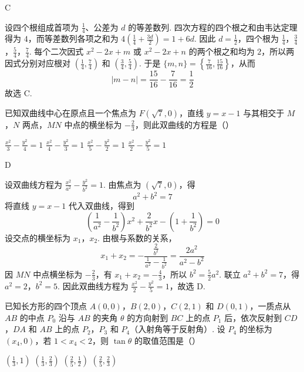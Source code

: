 \begin{answer}
C
\end{answer}

\begin{solution}
设四个根组成首项为 \(\frac14\)、公差为 \(d\) 的等差数列. 四次方程的四个根之和由韦达定理得为 \(4\)，而等差数列各项之和为 \(4\left(\frac14+\frac{3d}{2}\right)=1+6d\). 因此 \(d=\frac12\)，四个根为
\(\frac14\)，\(\frac34\)，\(\frac54\)，\(\frac74\).
每个二次因式 \(x^{2}-2x+m\) 或 \(x^{2}-2x+n\) 的两个根之和均为 \(2\)，所以两因式分别对应根对 \(\left(\frac14,\frac74\right)\) 和 \(\left(\frac34,\frac54\right)\). 于是 \(\{m,n\}=\left\{\frac{7}{16},\frac{15}{16}\right\}\)，从而
\[
|m-n|=\frac{15}{16}-\frac{7}{16}=\frac12
\]
故选 C.
\end{solution}

\begin{problem}
已知双曲线中心在原点且一个焦点为 \(F(\sqrt{7}, 0)\)，直线 \(y = x - 1\) 与其相交于 \(M\)，\(N\) 两点，\(MN\) 中点的横坐标为 \(-\frac{2}{3}\)，则此双曲线的方程是（\quad）

\choices
    {\(\frac{x^2}{3} - \frac{y^2}{4} = 1\)}
    {\(\frac{x^2}{4} - \frac{y^2}{3} = 1\)}
    {\(\frac{x^2}{5} - \frac{y^2}{2} = 1\)}
    {\(\frac{x^2}{2} - \frac{y^2}{5} = 1\)}
\end{problem}

\begin{answer}
D
\end{answer}

\begin{solution}
设双曲线方程为 \(\frac{x^{2}}{a^{2}}-\frac{y^{2}}{b^{2}}=1\). 由焦点为 \((\sqrt7,0)\)，得
\[
a^{2}+b^{2}=7
\]
将直线 \(y=x-1\) 代入双曲线，得到
\[
\left(\frac1{a^{2}}-\frac1{b^{2}}\right)x^{2}+\frac2{b^{2}}x-\left(1+\frac1{b^{2}}\right)=0
\]
设交点的横坐标为 \(x_{1}\)，\(x_{2}\). 由根与系数的关系，
\[
x_{1}+x_{2}=-\frac{\frac{2}{b^{2}}}{\frac{1}{a^{2}}-\frac{1}{b^{2}}}=\frac{2a^{2}}{a^{2}-b^{2}}
\]
因 \(MN\) 中点横坐标为 \(-\frac23\)，有 \(x_{1}+x_{2}=-\frac43\)，所以 \(b^{2}=\frac52a^{2}\). 联立 \(a^{2}+b^{2}=7\)，得 \(a^{2}=2\)，\(b^{2}=5\). 因此双曲线方程为 \(\frac{x^{2}}2-\frac{y^{2}}5=1\)，故选 D.
\end{solution}

\begin{problem}
已知长方形的四个顶点 \(A(0,0)\)，\(B(2,0)\)，\(C(2,1)\) 和 \(D(0,1)\)，一质点从 \(AB\) 的中点 \(P_0\) 沿与 \(AB\) 的夹角 \(\theta\) 的方向射到 \(BC\) 上的点 \(P_1\) 后，依次反射到 \(CD\)，\(DA\) 和 \(AB\) 上的点 \(P_2\)，\(P_3\) 和 \(P_4\)（入射角等于反射角）. 设 \(P_4\) 的坐标为 \((x_4,0)\)，若 \(1 < x_4 < 2\)，则 \(\tan \theta\) 的取值范围是（\quad）

\choices
    {\(\left(\frac{1}{3}, 1\right)\)}
    {\(\left(\frac{1}{3}, \frac{2}{3}\right)\)}
    {\(\left(\frac{2}{5}, \frac{1}{2}\right)\)}
    {\(\left(\frac{2}{5}, \frac{2}{3}\right)\)}
\end{problem}

